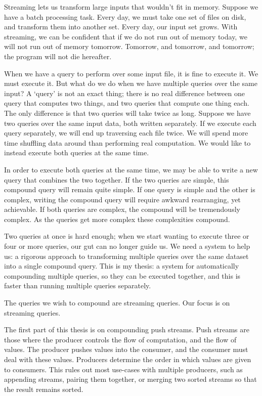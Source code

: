 Streaming lets us transform large inputs that wouldn't fit in memory.
Suppose we have a batch processing task.
Every day, we must take one set of files on disk, and transform them into another set.
Every day, our input set grows.
With streaming, we can be confident that if we do not run out of memory today, we will not run out of memory tomorrow.
Tomorrow, and tomorrow, and tomorrow; the program will not die hereafter.

When we have a query to perform over some input file, it is fine to execute it.
We must execute it.
But what do we do when we have multiple queries over the same input?
A `query' is not an exact thing; there is no real difference between one query that computes two things, and two queries that compute one thing each.
The only difference is that two queries will take twice as long.
Suppose we have two queries over the same input data, both written separately.
If we execute each query separately, we will end up traversing each file twice.
We will spend more time shuffling data around than performing real computation.
We would like to instead execute both queries at the same time.

In order to execute both queries at the same time, we may be able to write a new query that combines the two together.
If the two queries are simple, this compound query will remain quite simple.
If one query is simple and the other is complex, writing the compound query will require awkward rearranging, yet achievable.
If both queries are complex, the compound will be tremendously complex.
As the queries get more complex these complexities compound.

Two queries at once is hard enough; when we start wanting to execute three or four or more queries, our gut can no longer guide us.
We need a system to help us: a rigorous approach to transforming multiple queries over the same dataset into a single compound query.
This is my thesis: a system for automatically compounding multiple queries, so they can be executed together, and this is faster than running multiple queries separately.

The queries we wish to compound are streaming queries.
Our focus is on streaming queries.

The first part of this thesis is on compounding push streams.
Push streams are those where the producer controls the flow of computation, and the flow of values.
The producer pushes values into the consumer, and the consumer must deal with these values.
Producers determine the order in which values are given to consumers.
This rules out most use-cases with multiple producers, such as appending streams, pairing them together, or merging two sorted streams so that the result remains sorted.

